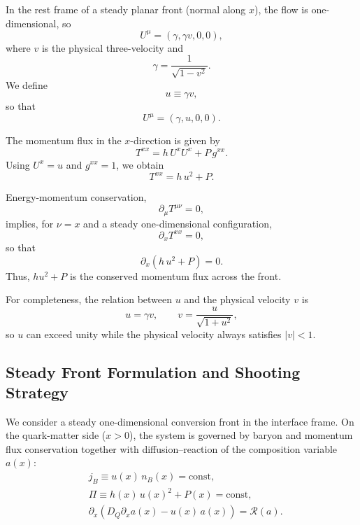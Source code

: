 \documentclass[11pt]{article}
\begin{document}
In the rest frame of a steady planar front (normal along $x$), the flow is one-dimensional, so
\begin{equation}
U^\mu = (\gamma, \gamma v, 0, 0),
\end{equation}
where $v$ is the physical three-velocity and
\begin{equation}
\gamma = \frac{1}{\sqrt{1 - v^2}}.
\end{equation}
We define
\begin{equation}
u \equiv \gamma v,
\end{equation}
so that
\begin{equation}
U^\mu = (\gamma, u, 0, 0).
\end{equation}

The momentum flux in the $x$-direction is given by
\begin{equation}
T^{xx} = h\,U^x U^x + P\,g^{xx}.
\end{equation}
Using $U^x = u$ and $g^{xx} = 1$, we obtain
\begin{equation}
\boxed{
T^{xx} = h\,u^2 + P.
}
\end{equation}

Energy-momentum conservation,
\begin{equation}
\partial_\mu T^{\mu\nu} = 0,
\end{equation}
implies, for $\nu = x$ and a steady one-dimensional configuration,
\begin{equation}
\partial_x T^{xx} = 0,
\end{equation}
so that
\begin{equation}
\boxed{
\partial_x \left(h\,u^2 + P\right) = 0.
}
\end{equation}
Thus, $h u^2 + P$ is the conserved momentum flux across the front.

For completeness, the relation between $u$ and the physical velocity $v$ is
\begin{equation}
u = \gamma v,
\qquad
v = \frac{u}{\sqrt{1 + u^2}},
\end{equation}
so $u$ can exceed unity while the physical velocity always satisfies $|v| < 1$.


\subsection{Steady Front Formulation and Shooting Strategy}

We consider a steady one-dimensional conversion front in the interface frame. 
On the quark-matter side ($x>0$), the system is governed by baryon and momentum flux conservation together with diffusion--reaction of the composition variable $a(x)$:
\begin{align}
& j_B \equiv u(x)\,n_B(x) = \text{const}, \\
& \Pi \equiv h(x)\,u(x)^2 + P(x) = \text{const}, \\
& \partial_x \!\left( D_Q \partial_x a(x) - u(x)\,a(x) \right) = \mathcal{R}(a).
\end{align}
\end{document}
